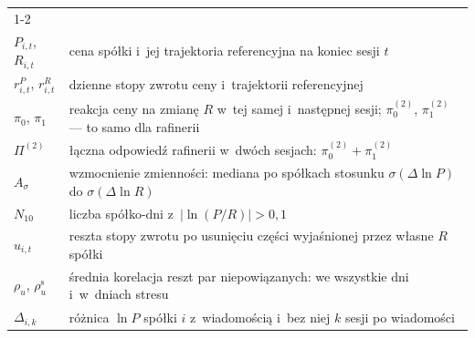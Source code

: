 \documentclass[11pt,a4paper]{article}
\begin{document}
\begin{table}[!ht]
\begin{tabular}{@{}l >{\raggedright\arraybackslash}p{}@{}}
\cmidrule(lr){1-2}
\multicolumn{2}{@{}l}{\textit{Wskaźniki}} \\ \addlinespace[2pt]
$P_{i,t}$, $R_{i,t}$ & cena spółki i~jej trajektoria referencyjna na koniec sesji $t$ \\
$r^P_{i,t}$, $r^R_{i,t}$ & dzienne stopy zwrotu ceny i~trajektorii referencyjnej \\
$\pi_0$, $\pi_1$ & reakcja ceny na zmianę $R$ w~tej samej i~następnej sesji; $\pi^{(2)}_0$,
  $\pi^{(2)}_1$ --- to samo dla rafinerii \\
$\Pi^{(2)}$ & łączna odpowiedź rafinerii w~dwóch sesjach: $\pi^{(2)}_0 + \pi^{(2)}_1$ \\
$A_\sigma$ & wzmocnienie zmienności: mediana po spółkach stosunku $\sigma(\Delta \ln P)$ do $\sigma(\Delta \ln R)$ \\
$N_{10}$ & liczba spółko-dni z~$|\ln (P/R)| > 0{,}1$ \\
$u_{i,t}$ & reszta stopy zwrotu po usunięciu części wyjaśnionej przez własne $R$ spółki \\
$\rho_u$, $\rho_u^{\mathrm{s}}$ & średnia korelacja reszt par niepowiązanych: we wszystkie dni i~w~dniach stresu \\
$\Delta_{i,k}$ & różnica $\ln P$ spółki $i$ z~wiadomością i~bez niej $k$ sesji po wiadomości \\
\bottomrule
\end{tabular}
\end{table}



\end{document}
